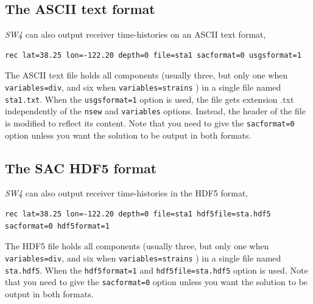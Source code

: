 \documentclass[11pt]{report}
\begin{document}
{%
\subsection{The ASCII text format}
\emph{SW4} can also output receiver time-histories on an ASCII text format,
\begin{verbatim}
rec lat=38.25 lon=-122.20 depth=0 file=sta1 sacformat=0 usgsformat=1
\end{verbatim}
The ASCII text file holds all components (usually three, but only one when {\tt
		variables=div}, and six when {\tt variables=strains} ) in a single file named {\tt sta1.txt}. When
the \verb+usgsformat=1+ option is used, the file gets extension .txt independently of the
\verb+nsew+ and \verb+variables+ options.  Instead, the header of the file is modified to reflect
its content. Note that you need to give the \verb+sacformat=0+ option unless you want the solution
to be output in both formats.

\subsection{The SAC HDF5 format}
\emph{SW4} can also output receiver time-histories in the HDF5 format,
\begin{verbatim}
rec lat=38.25 lon=-122.20 depth=0 file=sta1 hdf5file=sta.hdf5 sacformat=0 hdf5format=1
\end{verbatim}
The HDF5 file holds all components (usually three, but only one when {\tt
		variables=div}, and six when {\tt variables=strains} ) in a single file named {\tt sta.hdf5}. When
the \verb+hdf5format=1+ and \verb+hdf5file=sta.hdf5+ option is used.
Note that you need to give the \verb+sacformat=0+ option unless you want the solution
to be output in both formats.

}
\end{document}
